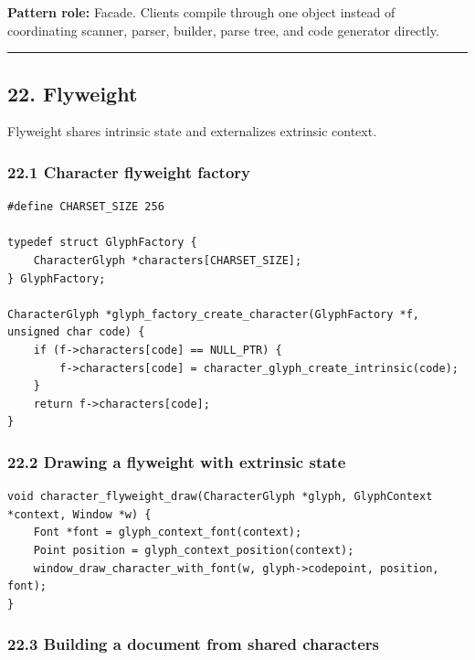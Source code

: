 \documentclass[11pt]{article}
\begin{document}
\textbf{Pattern role:} Facade. Clients compile through one object instead of coordinating scanner, parser, builder, parse tree, and code generator directly.

\begin{center}\rule{0.5\linewidth}{0.5pt}\end{center}

\subsection{22. Flyweight}\label{flyweight}

Flyweight shares intrinsic state and externalizes extrinsic context.

\subsubsection{22.1 Character flyweight factory}\label{character-flyweight-factory}

\begin{verbatim}
#define CHARSET_SIZE 256

typedef struct GlyphFactory {
    CharacterGlyph *characters[CHARSET_SIZE];
} GlyphFactory;

CharacterGlyph *glyph_factory_create_character(GlyphFactory *f, unsigned char code) {
    if (f->characters[code] == NULL_PTR) {
        f->characters[code] = character_glyph_create_intrinsic(code);
    }
    return f->characters[code];
}
\end{verbatim}

\subsubsection{22.2 Drawing a flyweight with extrinsic state}\label{drawing-a-flyweight-with-extrinsic-state}

\begin{verbatim}
void character_flyweight_draw(CharacterGlyph *glyph, GlyphContext *context, Window *w) {
    Font *font = glyph_context_font(context);
    Point position = glyph_context_position(context);
    window_draw_character_with_font(w, glyph->codepoint, position, font);
}
\end{verbatim}

\subsubsection{22.3 Building a document from shared characters}\label{building-a-document-from-shared-characters}
\end{document}

